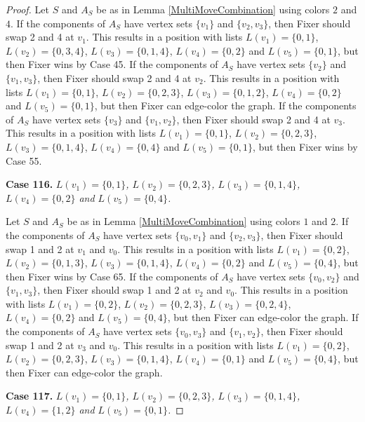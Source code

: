 \documentclass[12pt]{amsart}
\theoremstyle{plain}
\theoremstyle{definition}
\theoremstyle{remark}
\begin{document}
\begin{proof}
Let $S$ and $A_S$ be as in Lemma \ref{MultiMoveCombination} using colors $2$ and $4$. If the components of $A_S$ have vertex sets $\{v_1\}$ and $\{v_2, v_3\}$, then Fixer should swap 2 and 4 at $v_1$. This results in a position with lists $L(v_1) = \{0, 1\}$, $L(v_2) = \{0, 3, 4\}$, $L(v_3) = \{0, 1, 4\}$, $L(v_4) = \{0, 2\}$ and $L(v_5) = \{0, 1\}$, but then Fixer wins by Case 45.
If the components of $A_S$ have vertex sets $\{v_2\}$ and $\{v_1, v_3\}$, then Fixer should swap 2 and 4 at $v_2$. This results in a position with lists $L(v_1) = \{0, 1\}$, $L(v_2) = \{0, 2, 3\}$, $L(v_3) = \{0, 1, 2\}$, $L(v_4) = \{0, 2\}$ and $L(v_5) = \{0, 1\}$, but then Fixer can edge-color the graph.
If the components of $A_S$ have vertex sets $\{v_3\}$ and $\{v_1, v_2\}$, then Fixer should swap 2 and 4 at $v_3$. This results in a position with lists $L(v_1) = \{0, 1\}$, $L(v_2) = \{0, 2, 3\}$, $L(v_3) = \{0, 1, 4\}$, $L(v_4) = \{0, 4\}$ and $L(v_5) = \{0, 1\}$, but then Fixer wins by Case 55.

\noindent\textbf{Case 116.  }\textit{$L(v_1) = \{0, 1\}$, $L(v_2) = \{0, 2, 3\}$, $L(v_3) = \{0, 1, 4\}$, $L(v_4) = \{0, 2\}$ and $L(v_5) = \{0, 4\}$.}

Let $S$ and $A_S$ be as in Lemma \ref{MultiMoveCombination} using colors $1$ and $2$. If the components of $A_S$ have vertex sets $\{v_0, v_1\}$ and $\{v_2, v_3\}$, then Fixer should swap 1 and 2 at $v_1$ and $v_0$. This results in a position with lists $L(v_1) = \{0, 2\}$, $L(v_2) = \{0, 1, 3\}$, $L(v_3) = \{0, 1, 4\}$, $L(v_4) = \{0, 2\}$ and $L(v_5) = \{0, 4\}$, but then Fixer wins by Case 65.
If the components of $A_S$ have vertex sets $\{v_0, v_2\}$ and $\{v_1, v_3\}$, then Fixer should swap 1 and 2 at $v_2$ and $v_0$. This results in a position with lists $L(v_1) = \{0, 2\}$, $L(v_2) = \{0, 2, 3\}$, $L(v_3) = \{0, 2, 4\}$, $L(v_4) = \{0, 2\}$ and $L(v_5) = \{0, 4\}$, but then Fixer can edge-color the graph.
If the components of $A_S$ have vertex sets $\{v_0, v_3\}$ and $\{v_1, v_2\}$, then Fixer should swap 1 and 2 at $v_3$ and $v_0$. This results in a position with lists $L(v_1) = \{0, 2\}$, $L(v_2) = \{0, 2, 3\}$, $L(v_3) = \{0, 1, 4\}$, $L(v_4) = \{0, 1\}$ and $L(v_5) = \{0, 4\}$, but then Fixer can edge-color the graph.

\noindent\textbf{Case 117.  }\textit{$L(v_1) = \{0, 1\}$, $L(v_2) = \{0, 2, 3\}$, $L(v_3) = \{0, 1, 4\}$, $L(v_4) = \{1, 2\}$ and $L(v_5) = \{0, 1\}$.}


\end{proof}
\end{document}
